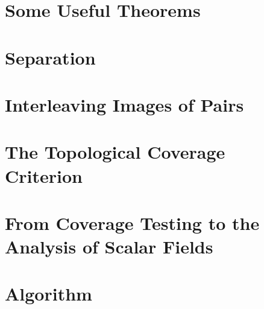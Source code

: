 \documentclass[12pt]{article}
\begin{document}

\section{Some Useful Theorems}


\section{Separation}


\clearpage
\section{Interleaving Images of Pairs}


\clearpage
\section{The Topological Coverage Criterion}


\clearpage
\section{From Coverage Testing to the Analysis of Scalar Fields}

%


\clearpage
\section{Algorithm}

%
%
% 
%
% 
\end{document}
